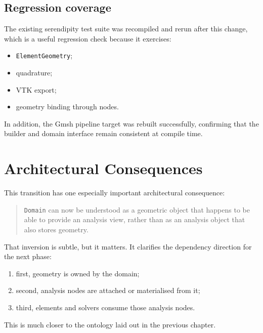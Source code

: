 \subsection{Regression coverage}

The existing serendipity test suite was recompiled and rerun after this change,
which is a useful regression check because it exercises:

\begin{itemize}[nosep]
  \item \texttt{ElementGeometry};
  \item quadrature;
  \item VTK export;
  \item geometry binding through nodes.
\end{itemize}

In addition, the Gmsh pipeline target was rebuilt successfully, confirming that
the builder and domain interface remain consistent at compile time.


\section{Architectural Consequences}
\label{sec:domain-vertex-transition-consequences}

This transition has one especially important architectural consequence:

\begin{quote}
\texttt{Domain} can now be understood as a geometric object that happens to be
able to provide an analysis view, rather than as an analysis object that also
stores geometry.
\end{quote}

That inversion is subtle, but it matters.  It clarifies the dependency
direction for the next phase:

\begin{enumerate}[nosep]
  \item first, geometry is owned by the domain;
  \item second, analysis nodes are attached or materialised from it;
  \item third, elements and solvers consume those analysis nodes.
\end{enumerate}

This is much closer to the ontology laid out in the previous chapter.


